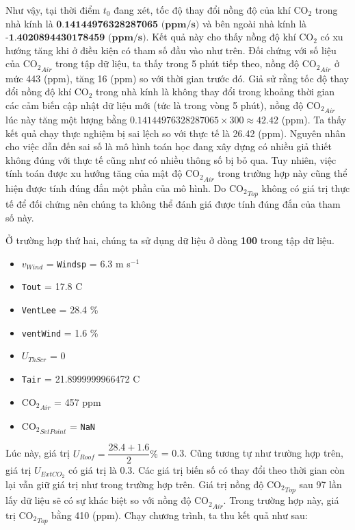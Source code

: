 \documentclass[a4paper]{article}
\begin{document}
Như vậy, tại thời điểm $t_0$ đang xét, tốc độ thay đổi nồng độ của khí $\mathrm{CO_{2}}$ trong nhà kính là $\textbf{0.14144976328287065 (ppm/s)}$ và bên ngoài nhà kính là $\textbf{-1.4020894430178459 (ppm/s)}$. Kết quả này cho thấy nồng độ khí $\mathrm{CO_{2}}$ có xu hướng tăng khi ở điều kiện có tham số đầu vào như trên. Đối chứng với số liệu của $\mathrm{CO_{2}}_{Air}$ trong tập dữ liệu, ta thấy trong 5 phút tiếp theo, nồng độ $\mathrm{CO_{2}}_{Air}$ ở mức 443 (ppm), tăng 16 (ppm) so với thời gian trước đó. Giả sử rằng tốc độ thay đổi nồng độ khí $\mathrm{CO_{2}}$ trong nhà kính là không thay đổi trong khoảng thời gian các cảm biến cập nhật dữ liệu mới (tức là trong vòng 5 phút), nồng độ $\mathrm{CO_{2}}_{Air}$ lúc này tăng một lượng bằng $0.14144976328287065 \times 300 \approx 42.42$ (ppm). Ta thấy kết quả chạy thực nghiệm bị sai lệch so với thực tế là 26.42 (ppm). Nguyên nhân cho việc dẫn đến sai số là mô hình toán học đang xây dựng có nhiều giả thiết không đúng với thực tế cũng như có nhiều thông số bị bỏ qua. Tuy nhiên, việc tính toán được xu hướng tăng của mật độ $\mathrm{CO_{2}}_{Air}$ trong trường hợp này cũng thể hiện được tính đúng đắn một phần của mô hình. Do  $\mathrm{CO_{2}}_{Top}$ không có giá trị thực tế để đối chứng nên chúng ta không thể đánh giá được tính đúng đắn của tham số này.\par

Ở trường hợp thứ hai, chúng ta sử dụng dữ liệu ở dòng \textbf{100} trong tập dữ liệu.
\begin{itemize}
    \item $v_{Wind}$ = \texttt{Windsp} = 6.3 m s$^{-1}$ 
    \item \texttt{Tout} = 17.8 \degree C
    \item \texttt{VentLee} = 28.4 \%
    \item \texttt{ventWind} = 1.6 \%
    \item $U_{ThScr}$ = 0
    \item \texttt{Tair} = 21.8999999966472 \degree C
    \item $\mathrm{CO_{2}}_{Air}$ = 457 ppm
    \item $\mathrm{CO_{2}}_{SetPoint}$ = \texttt{NaN}
\end{itemize}

Lúc này, giá trị $U_{Roof} = \dfrac{28.4 + 1.6}{2}\%$ = 0.3. Cũng tương tự như trường hợp trên, giá trị $U_{ExtCO_{2}}$ có giá trị là $0.3$. Các giá trị biến số có thay đổi theo thời gian còn lại vẫn giữ giá trị như trong trường hợp trên. Giá trị nồng độ $\mathrm{CO_{2}}_{Top}$ sau 97 lần lấy dữ liệu sẽ có sự khác biệt so với nồng độ $\mathrm{CO_{2}}_{Air}$. Trong trường hợp này, giá trị $\mathrm{CO_{2}}_{Top}$ bằng 410 (ppm). Chạy chương trình, ta thu kết quả như sau:
\end{document}
